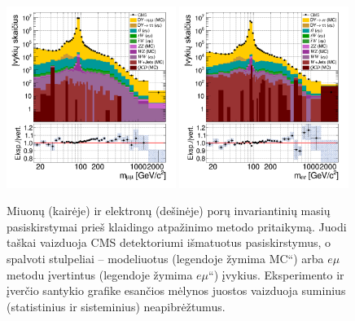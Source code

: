 \documentclass[a4paper, 12pt, oneside]{article}
\newcommand{\emu}{e\mu}
\newcommand{\ltq}[1]{{\quotedblbase{}#1\textquotedblleft{}}}
\newlength\q
\begin{document}
\begin{figure}[b!]
	\includegraphics[width=0.49\textwidth]{Magistrinis/MuMumass_beforeFR.png}
	\includegraphics[width=0.49\textwidth]{Magistrinis/EEmass_beforeFR.png}
	\vspace{-0.5cm}
	\caption{\label{fig:MassBefore}
		Miuonų (kairėje) ir elektronų (dešinėje) porų invariantinių masių pasiskirstymai prieš klaidingo atpažinimo metodo
		pritaikymą.
		Juodi taškai vaizduoja CMS detektoriumi išmatuotus pasiskirstymus, o spalvoti stulpeliai -- modeliuotus (legendoje
		žymima \ltq{MC}) arba $\emu$ metodu įvertintus (legendoje žymima \ltq{$\emu$}) įvykius.
		Eksperimento ir įverčio santykio grafike esančios mėlynos juostos vaizduoja suminius (statistinius ir sisteminius)
		neapibrėžtumus.}
\end{figure}
\end{document}
